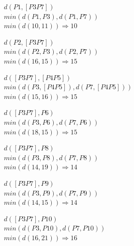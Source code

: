 \documentclass{article}
\begin{document}
  \begin{center}
    $d(P1,[P3 P7])$ \\
    $min(d(P1,P3), d(P1, P7))$ \\
    $min(d(10, 11)) \Rightarrow 10$ \\
  \end{center}
  \begin{center}
    $d(P2,[P3 P7])$ \\
    $min(d(P2,P3), d(P2, P7))$ \\
    $min(d(16, 15)) \Rightarrow 15$ \\
  \end{center}
  \begin{center}
    $d([P3 P7], [P4 P5])$ \\
    $min(d(P3, [P4 P5]), d(P7, [P4 P5]))$ \\
    $min(d(15, 16)) \Rightarrow 15$ \\
  \end{center}
  \begin{center}
    $d([P3 P7], P6)$ \\
    $min(d(P3,P6), d(P7, P6))$ \\
    $min(d(18, 15)) \Rightarrow 15$ \\
  \end{center}
  \begin{center}
    $d([P3 P7], P8)$ \\
    $min(d(P3,P8), d(P7, P8))$ \\
    $min(d(14, 19)) \Rightarrow 14$ \\
  \end{center}
  \begin{center}
    $d([P3 P7], P9)$ \\
    $min(d(P3,P9), d(P7, P9))$ \\
    $min(d(14, 15)) \Rightarrow 14$ \\
  \end{center}
  \begin{center}
    $d([P3 P7], P10)$ \\
    $min(d(P3,P10), d(P7, P10))$ \\
    $min(d(16, 21)) \Rightarrow 16$ \\
  \end{center}
\end{document}
